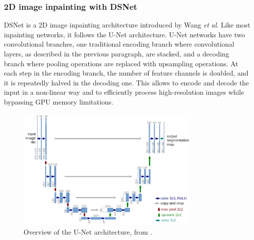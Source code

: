 \documentclass{article}
\begin{document}
\subsubsection{2D image inpainting with DSNet}

DSNet \cite{DSNet} is a 2D image inpainting architecture introduced by Wang \textit{et al}. Like most inpainting networks, it follows the U-Net \cite{U_Net} architecture. U-Net networks have two convolutional branches, one traditional encoding branch where convolutional layers, as described in the previous paragraph, are stacked, and a decoding branch where pooling operations are replaced with upsampling operations. At each step in the encoding branch, the number of feature channels is doubled, and it is repeatedly halved in the decoding one. This allows to encode and decode the input in a non-linear way and to efficiently process high-resolution images while bypassing GPU memory limitations. \\
\begin{figure}[H]
    \centering
    \includegraphics[height=6cm,width=\textwidth,keepaspectratio]{u_net.png}
    \caption{Overview of the U-Net architecture, from \cite{U_Net}.}
    \label{fig:u_net}
\end{figure}
\end{document}
